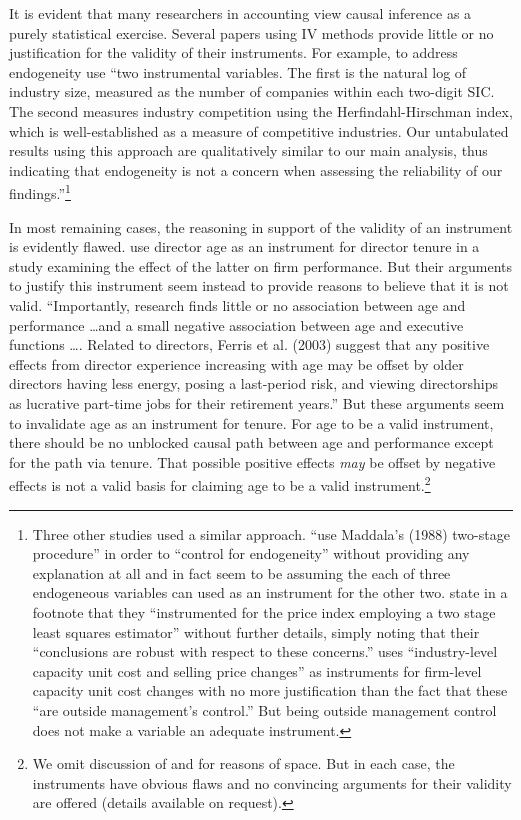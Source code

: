\documentclass[11pt,reqno,titlepage]{amsart}
\begin{document}
\begin{doublespace}
It is evident that many researchers in accounting view causal inference as a purely statistical exercise.
Several papers using IV methods  provide little or no justification for the validity of their instruments.
For example, to address endogeneity \citet{Cohen:2014jl} use ``two instrumental variables. The first is the natural log of industry size, measured as the number of companies within each two-digit SIC. The second measures industry competition using the Herfindahl-Hirschman index, which is well-established as a measure of competitive industries. Our untabulated results using this approach are qualitatively similar to our main analysis, thus indicating that endogeneity is not a concern when assessing the reliability of our findings.''\footnote{
Three other studies used a similar approach.
 \citet{Vermeer:2014bs} ``use Maddala's (1988) two-stage procedure'' in order to ``control for endogeneity'' without providing any explanation at all and in fact seem to be assuming the each of three endogeneous variables can used as an instrument for the other two.
\citet[p.48]{Fox:2014io} state in a footnote that they ``instrumented for the price index employing a two stage least squares estimator'' without further details, simply noting that their ``conclusions are robust with respect to these concerns.''
\citet{Cannon:2014im} uses ``industry-level capacity unit cost and selling price changes'' as instruments for firm-level capacity unit cost changes with no more justification than the fact that these ``are outside management's control.'' But being outside management control does not make a variable an adequate instrument.}

In most remaining cases, the reasoning in support of the validity of an instrument is evidently flawed. \citet{Kim:2014fm} use director age as an instrument for director tenure in a study examining the effect of the latter on firm performance. 
But their arguments to justify this instrument seem instead to provide reasons to believe that it is not valid. 
``Importantly, research finds little or no association between age and performance \dots and a small negative association between age and executive functions \dots. 
Related to directors, Ferris et al. (2003) suggest that any positive effects from director experience increasing with age may be offset by older directors having less energy, posing a last-period risk, and viewing directorships as lucrative part-time jobs for their retirement years.'' 
But these arguments seem to invalidate age as an instrument for tenure. 
For age to be a valid instrument, there should be no unblocked causal path between age and performance except for the path via tenure.
That possible positive effects \emph{may} be offset by negative effects is not a valid basis for claiming age to be a valid instrument.\footnote{
We omit discussion of  \citet{Erkens:2014hj,Houston:2014hv} and \citet{deFranco:2014ct} for reasons of space. But in each case, the instruments have obvious flaws and no convincing arguments for their validity are offered (details available on request).}


\end{doublespace}
\end{document}
